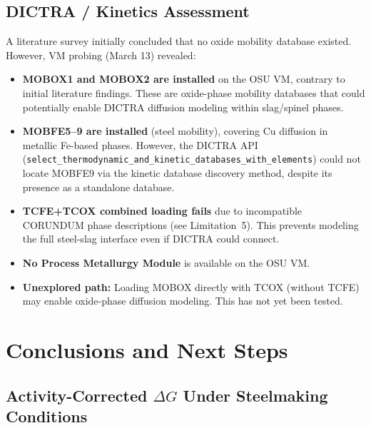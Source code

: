 \documentclass[11pt]{article}
\begin{document}
\subsection{DICTRA / Kinetics Assessment}

A literature survey initially concluded that no oxide mobility database existed. However, VM probing (March 13) revealed:

\begin{itemize}[leftmargin=*]
    \item \textbf{MOBOX1 and MOBOX2 are installed} on the OSU VM, contrary to initial literature findings. These are oxide-phase mobility databases that could potentially enable DICTRA diffusion modeling within slag/spinel phases.

    \item \textbf{MOBFE5--9 are installed} (steel mobility), covering Cu diffusion in metallic Fe-based phases. However, the DICTRA API (\texttt{select\_thermodynamic\_and\_kinetic\_databases\_with\_elements}) could not locate MOBFE9 via the kinetic database discovery method, despite its presence as a standalone database.

    \item \textbf{TCFE+TCOX combined loading fails} due to incompatible CORUNDUM phase descriptions (see Limitation~5). This prevents modeling the full steel-slag interface even if DICTRA could connect.

    \item \textbf{No Process Metallurgy Module} is available on the OSU VM.

    \item \textbf{Unexplored path:} Loading MOBOX directly with TCOX (without TCFE) may enable oxide-phase diffusion modeling. This has not yet been tested.
\end{itemize}

\section{Conclusions and Next Steps}

\subsection{Activity-Corrected $\Delta G$ Under Steelmaking Conditions}
\end{document}
